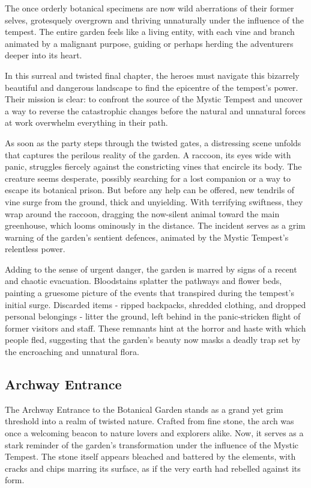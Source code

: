 The once orderly botanical specimens are now wild aberrations of their former selves, grotesquely overgrown and thriving unnaturally under the influence of the tempest. The entire garden feels like a living entity, with each vine and branch animated by a malignant purpose, guiding or perhaps herding the adventurers deeper into its heart.

In this surreal and twisted final chapter, the heroes must navigate this bizarrely beautiful and dangerous landscape to find the epicentre of the tempest's power. Their mission is clear: to confront the source of the Mystic Tempest and uncover a way to reverse the catastrophic changes before the natural and unnatural forces at work overwhelm everything in their path.

As soon as the party steps through the twisted gates, a distressing scene unfolds that captures the perilous reality of the garden. A raccoon, its eyes wide with panic, struggles fiercely against the constricting vines that encircle its body. The creature seems desperate, possibly searching for a lost companion or a way to escape its botanical prison. But before any help can be offered, new tendrils of vine surge from the ground, thick and unyielding. With terrifying swiftness, they wrap around the raccoon, dragging the now-silent animal toward the main greenhouse, which looms ominously in the distance. The incident serves as a grim warning of the garden's sentient defences, animated by the Mystic Tempest's relentless power.

Adding to the sense of urgent danger, the garden is marred by signs of a recent and chaotic evacuation. Bloodstains splatter the pathways and flower beds, painting a gruesome picture of the events that transpired during the tempest's initial surge. Discarded items - ripped backpacks, shredded clothing, and dropped personal belongings - litter the ground, left behind in the panic-stricken flight of former visitors and staff. These remnants hint at the horror and haste with which people fled, suggesting that the garden's beauty now masks a deadly trap set by the encroaching and unnatural flora.

\subsection*{Archway Entrance}
The Archway Entrance to the Botanical Garden stands as a grand yet grim threshold into a realm of twisted nature. Crafted from fine stone, the arch was once a welcoming beacon to nature lovers and explorers alike. Now, it serves as a stark reminder of the garden's transformation under the influence of the Mystic Tempest. The stone itself appears bleached and battered by the elements, with cracks and chips marring its surface, as if the very earth had rebelled against its form.

